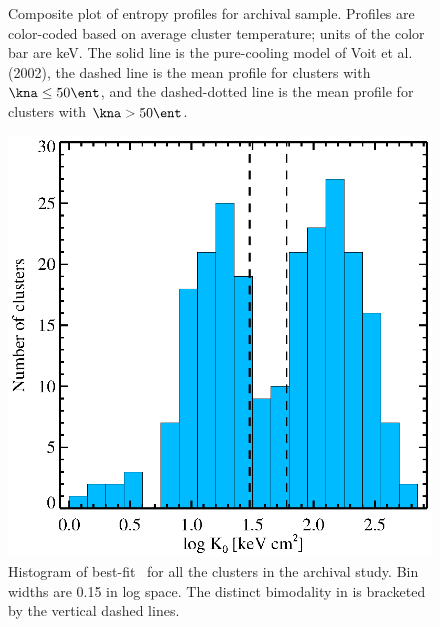 \documentclass[12pt]{cv}
\begin{document}
\begin{figure}[t]
\begin{minipage}[t]{0.5\linewidth}
        \caption{\footnotesize Composite plot of entropy profiles for
          archival sample. Profiles are color-coded based on average
          cluster temperature; units of the color bar are keV. The
          solid line is the pure-cooling model of Voit et al. (2002),
          the dashed line is the mean profile for clusters with $\kna
          \le 50 \ent$, and the dashed-dotted line is the mean profile
          for clusters with $\kna > 50 \ent$.}
        \label{fig:splots}
    \end{minipage}
    \hspace{0.1in}
    \begin{minipage}[t]{0.5\linewidth}
        \centering
        \includegraphics*[width=\textwidth, trim=32mm 8mm 32mm 18mm, clip]{k0hist.eps}
        \caption{\footnotesize Histogram of best-fit \kna\ for all the
          clusters in the archival study. Bin widths are 0.15 in log
          space. The distinct bimodality in \kna is bracketed by the
          vertical dashed lines.}
        \label{fig:k0hist}
    \end{minipage}
    \hspace{0.1cm}
    \begin{minipage}[t]{0.5\linewidth}
        \centering

\end{minipage}
\end{figure}
\end{document}
